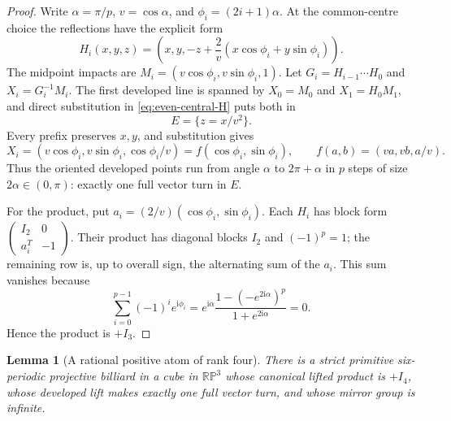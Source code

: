 \documentclass[11pt,a4paper]{article}
\theoremstyle{plain}
\newtheorem{lemma}[theorem]{Lemma}
\theoremstyle{definition}
\theoremstyle{remark}
\begin{document}
\begin{proof}
Write $\alpha=\pi/p$, $v=\cos\alpha$, and
$\phi_i=(2i+1)\alpha$. At the common-centre choice the reflections have the
explicit form
\begin{equation}\label{eq:even-central-H}
 H_i(x,y,z)=\left(x,y,-z+\frac2v
       (x\cos\phi_i+y\sin\phi_i)\right).
\end{equation}
The midpoint impacts are $M_i=(v\cos\phi_i,v\sin\phi_i,1)$. Let
$G_i=H_{i-1}\cdots H_0$ and $X_i=G_i^{-1}M_i$. The first developed line is
spanned by $X_0=M_0$ and $X_1=H_0M_1$, and direct substitution in
\eqref{eq:even-central-H} puts both in
\[
                         E=\{z=x/v^2\}.
\]
Every prefix preserves $x,y$, and substitution gives
\begin{equation}\label{eq:even-central-f}
 X_i=(v\cos\phi_i,v\sin\phi_i,\cos\phi_i/v)
     =f(\cos\phi_i,\sin\phi_i),\qquad
 f(a,b)=(va,vb,a/v).
\end{equation}
Thus the oriented developed points run from angle $\alpha$ to
$2\pi+\alpha$ in $p$ steps of size $2\alpha\in(0,\pi)$: exactly one full
vector turn in $E$.

For the product, put $a_i=(2/v)(\cos\phi_i,\sin\phi_i)$. Each $H_i$ has
block form $\left(\begin{smallmatrix}I_2&0\\a_i^T&-1\end{smallmatrix}\right)$.
Their product has diagonal blocks $I_2$ and $(-1)^p=1$; the remaining row is,
up to overall sign, the alternating sum of the $a_i$. This sum vanishes because
\[
 \sum_{i=0}^{p-1}(-1)^i e^{\mathrm i\phi_i}
 =e^{\mathrm i\alpha}\frac{1-(-e^{2\mathrm i\alpha})^p}
                         {1+e^{2\mathrm i\alpha}}=0.
\]
Hence the product is $+I_3$.
\end{proof}

\begin{lemma}[A rational positive atom of rank four]
\label{lem:rational-positive-cube}
There is a strict primitive six-periodic projective billiard in a cube in
$\mathbb {RP}^3$ whose canonical lifted product is $+I_4$, whose developed lift
makes exactly one full vector turn, and whose mirror group is infinite.
\end{lemma}
\end{document}
